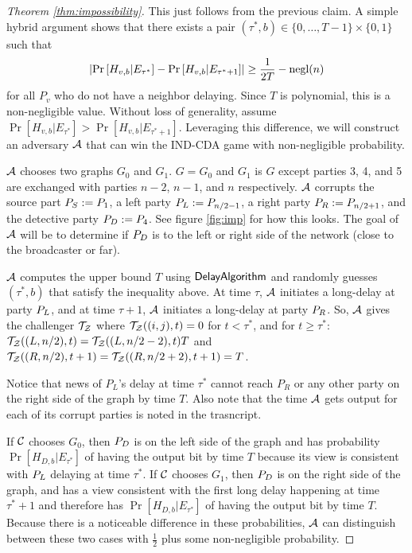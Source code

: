 \begin{proof}[Theorem \ref{thm:impossibility}]
	This just follows from the previous claim. A simple hybrid argument shows that there exists a pair $(\tau^*, b) \in \{0,\ldots, T-1\} \times \{0,1\}$ such that 
	\[ \lvert \Pr \left[H_{v,b} | E_{\tau^*} \right] - \Pr \left[ H_{v,b} | E_{\tau^* + 1} \right] \rvert \geq \frac 1 {2T} - \text{negl}(n) \]
	for all $P_v$ who do not have a neighbor delaying. Since $T$ is polynomial, this is a non-negligible value. Without loss of generality, assume $\Pr[ H_{v,b} | E_{\tau^*}] > \Pr[H_{v,b} | E_{\tau^* + 1}]$. Leveraging this difference, we will construct an adversary $\mathcal{A}$ that can win the IND-CDA game with non-negligible probability.
	
	$\mathcal{A}$ chooses two graphs $G_0$ and $G_1$. $G = G_0$ and $G_1$ is $G$ except parties 3, 4, and 5 are exchanged with parties $n-2$, $n-1$, and $n$ respectively. $\mathcal{A}$ corrupts the source part $P_S := P_1$, a left party $P_L := P_{n/2-1}$, a right party $P_R := P_{n/2 + 1}$, and the detective party $P_D := P_4$. See figure \ref{fig:imp} for how this looks. The goal of $\mathcal{A}$ will be to determine if $P_D$ is to the left or right side of the network (close to the broadcaster or far).
	
	$\mathcal{A}$ computes the upper bound $T$ using $\mathsf{DelayAlgorithm}$ and randomly guesses $(\tau^*, b)$ that satisfy the inequality above. At time $\tau$, $\mathcal{A}$ initiates a long-delay at party $P_L$, and at time $\tau+1$, $\mathcal{A}$ initiates a long-delay at party $P_R$. So, $\mathcal{A}$ gives the challenger $\mathcal{T}_{\mathcal{Z}}$ where $\mathcal{T}_{\mathcal{Z}}((i,j), t) = 0$ for $t < \tau^*$, and for $t \geq \tau^*$: $\mathcal{T}_{\mathcal{Z}}((L, n/2), t) = \mathcal{T}_{\mathcal{Z}}((L, n/2-2), t) T$ and $\mathcal{T}_{\mathcal{Z}}((R, n/2), t+1) = \mathcal{T}_{\mathcal{Z}}((R, n/2 + 2), t+1) = T$.
	
	Notice that news of $P_L$'s delay at time $\tau^*$ cannot reach $P_R$ or any other party on the right side of the graph by time $T$. Also note that the time $\mathcal{A}$ gets output for each of its corrupt parties is noted in the trasncript.
	
	If $\mathcal{C}$ chooses $G_0$, then $P_D$ is on the left side of the graph and has probability $\Pr[H_{D, b} | E_{\tau^*}]$ of having the output bit by time $T$ because its view is consistent with $P_L$ delaying at time $\tau^*$.
	If $\mathcal{C}$ chooses $G_1$, then $P_D$ is on the right side of the graph, and has a view consistent with the first long delay happening at time $\tau^*+1$ and therefore has $\Pr[H_{D,b} | E_{\tau^*}]$ of having the output bit by time $T$.
	Because there is a noticeable difference in these probabilities, $\mathcal{A}$ can distinguish between these two cases with $\frac 1 2$ plus some non-negligible probability.
\end{proof}

